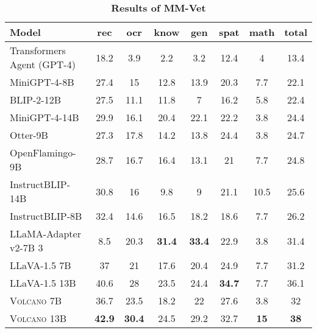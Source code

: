 \documentclass[11pt]{article}
\newcommand{\Ours}{\textsc{Volcano}}
\begin{document}
\begin{table*}[t]
\centering
\begin{tabular}{lcccccc|c}
\toprule
Model & rec  & ocr & know & gen & spat & math & total \\
\midrule
Transformers Agent (GPT-4)	& 18.2 & 3.9 & 2.2&	3.2	&12.4	&4&	13.4 \\
MiniGPT-4-8B&	27.4&	15&	12.8&	13.9	&20.3&	7.7&	22.1 \\
BLIP-2-12B	&27.5&	11.1	&11.8&	7&	16.2&	5.8	&22.4 \\
MiniGPT-4-14B&	29.9&	16.1&	20.4&	22.1&	22.2&	3.8&	24.4 \\
Otter-9B	&27.3&	17.8	&14.2&	13.8&	24.4&	3.8&	24.7 \\
OpenFlamingo-9B&	28.7&	16.7	&16.4	&13.1	&21	&7.7	&24.8 \\
InstructBLIP-14B&	30.8	&16	&9.8	&9	&21.1	&10.5	&25.6 \\
InstructBLIP-8B	&32.4	&14.6	&16.5	&18.2	&18.6	&7.7	&26.2 \\
LLaMA-Adapter v2-7B	3&8.5	&20.3	&\textbf{31.4}	&\textbf{33.4}	&22.9	&3.8	&31.4 \\
\midrule
LLaVA-1.5 7B	&37	&21	&17.6&	20.4&	24.9	&7.7&	31.2 \\
LLaVA-1.5 13B	&40.6	&28	&23.5	&24.4	&\textbf{34.7}	&7.7	&36.1 \\
{\Ours} 7B	&36.7	&23.5	&18.2	&22	&27.6	&3.8	&32 \\
{\Ours} 13B	&\textbf{42.9}	&\textbf{30.4}	&24.5	&29.2	&32.7	&\textbf{15}	&\textbf{38} \\
\bottomrule
\end{tabular}
\caption{\textbf{Results of MM-Vet}}
\label{tab:Table8}
\end{table*}
\end{document}
